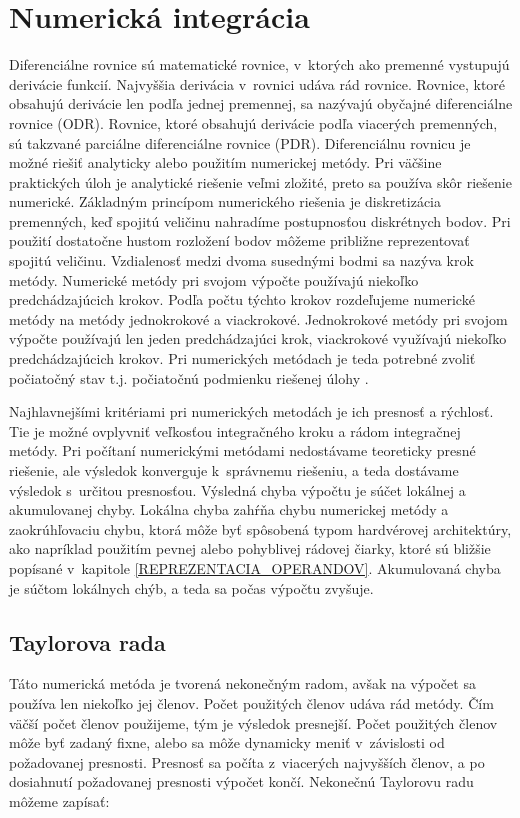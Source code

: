 \chapter{Numerická integrácia} \label{NUM_INTEGRACIA}


Diferenciálne rovnice sú matematické rovnice, v~ktorých ako premenné vystupujú derivácie funkcií. Najvyššia derivácia v~rovnici udáva rád rovnice. Rovnice, ktoré obsahujú derivácie len podľa jednej premennej, sa nazývajú obyčajné diferenciálne rovnice (ODR). Rovnice, ktoré obsahujú derivácie podľa viacerých premenných, sú takzvané parciálne diferenciálne rovnice (PDR).
Diferenciálnu rovnicu je možné riešiť analyticky alebo použitím numerickej metódy. Pri väčšine praktických úloh je analytické riešenie veľmi zložité, preto sa používa skôr riešenie numerické. Základným princípom numerického riešenia je diskretizácia premenných, keď spojitú veličinu nahradíme postupnosťou diskrétnych bodov. Pri použití dostatočne hustom rozložení bodov môžeme približne reprezentovať spojitú veličinu. Vzdialenosť medzi dvoma susednými bodmi sa nazýva krok metódy. Numerické metódy pri svojom výpočte používajú niekoľko predchádzajúcich krokov. Podľa počtu týchto krokov rozdeľujeme numerické metódy na metódy jednokrokové a viackrokové. Jednokrokové metódy pri svojom výpočte používajú len jeden predchádzajúci krok, viackrokové využívajú niekoľko predchádzajúcich krokov. Pri numerických metódach je teda potrebné zvoliť počiatočný stav t.j. počiatočnú podmienku riešenej úlohy \cite{NumMetody}.

Najhlavnejšími kritériami pri numerických metodách je ich presnosť a rýchlosť. Tie je možné ovplyvniť veľkosťou integračného kroku a rádom integračnej metódy. Pri počítaní numerickými metódami nedostávame teoreticky presné riešenie, ale výsledok konverguje k~správnemu riešeniu, a teda dostávame výsledok s~určitou presnosťou. Výsledná chyba výpočtu je súčet lokálnej a akumulovanej chyby.  Lokálna chyba zahŕňa chybu numerickej metódy a zaokrúhľovaciu chybu, ktorá môže byť spôsobená typom hardvérovej architektúry, ako napríklad použitím pevnej alebo pohyblivej rádovej čiarky, ktoré sú bližšie popísané v~kapitole \ref{REPREZENTACIA_OPERANDOV}. Akumulovaná chyba je súčtom lokálnych chýb, a teda sa počas výpočtu zvyšuje.


\section{Taylorova rada}
Táto numerická metóda je tvorená nekonečným radom, avšak na výpočet sa používa len niekoľko jej členov. Počet použitých členov udáva rád metódy. Čím väčší počet členov použijeme, tým je výsledok presnejší. Počet použitých členov môže byť zadaný fixne, alebo sa môže dynamicky meniť v~závislosti od požadovanej presnosti. Presnosť sa počíta z~viacerých najvyšších členov, a po dosiahnutí požadovanej presnosti výpočet končí.
Nekonečnú Taylorovu radu môžeme zapísať:

